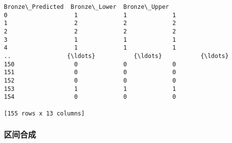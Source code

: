 \documentclass[11pt]{article}
\begin{document}
\begin{Verbatim}[commandchars=\\\{\}]
     Bronze\_Predicted  Bronze\_Lower  Bronze\_Upper
0                   1             1             1
1                   2             2             2
2                   2             2             2
3                   1             1             1
4                   1             1             1
..                {\ldots}           {\ldots}           {\ldots}
150                 0             0             0
151                 0             0             0
152                 0             0             0
153                 1             1             1
154                 0             0             0

[155 rows x 13 columns]
    \end{Verbatim}

    \subsubsection{区间合成}\label{ux533aux95f4ux5408ux6210}
\end{document}
